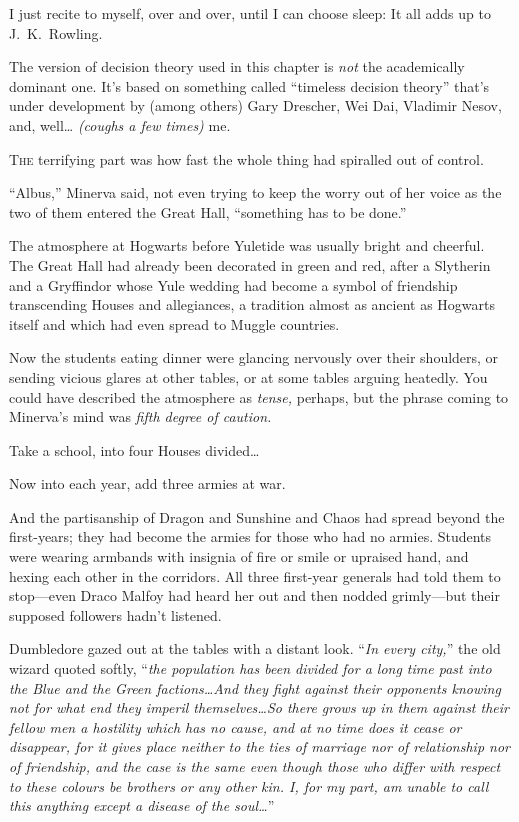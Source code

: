 
\begin{chapterOpeningAuthorNote}
I just recite to myself, over and over, until I can choose sleep: It all adds up to J.~K.~Rowling.

The version of decision theory used in this chapter is \emph{not} the academically dominant one. It’s based on something called “timeless decision theory” that’s under development by (among others) Gary Drescher, Wei Dai, Vladimir Nesov, and, well… \emph{(coughs a few times)} me.
\end{chapterOpeningAuthorNote}

\lettrine{T}{he} terrifying part was how fast the whole thing had spiralled out of control.

“Albus,” Minerva said, not even trying to keep the worry out of her voice as the two of them entered the Great Hall, “something has to be done.”

The atmosphere at Hogwarts before Yuletide was usually bright and cheerful. The Great Hall had already been decorated in green and red, after a Slytherin and a Gryffindor whose Yule wedding had become a symbol of friendship transcending Houses and allegiances, a tradition almost as ancient as Hogwarts itself and which had even spread to Muggle countries.

Now the students eating dinner were glancing nervously over their shoulders, or sending vicious glares at other tables, or at some tables arguing heatedly. You could have described the atmosphere as \emph{tense,} perhaps, but the phrase coming to Minerva’s mind was \emph{fifth degree of caution.}

Take a school, into four Houses divided…

Now into each year, add three armies at war.

And the partisanship of Dragon and Sunshine and Chaos had spread beyond the first-years; they had become the armies for those who had no armies. Students were wearing armbands with insignia of fire or smile or upraised hand, and hexing each other in the corridors. All three first-year generals had told them to stop—even Draco Malfoy had heard her out and then nodded grimly—but their supposed followers hadn’t listened.

Dumbledore gazed out at the tables with a distant look. “\emph{In every city,}” the old wizard quoted softly, “\emph{the population has been divided for a long time past into the Blue and the Green factions…And they fight against their opponents knowing not for what end they imperil themselves…So there grows up in them against their fellow men a hostility which has no cause, and at no time does it cease or disappear, for it gives place neither to the ties of marriage nor of relationship nor of friendship, and the case is the same even though those who differ with respect to these colours be brothers or any other kin. I, for my part, am unable to call this anything except a disease of the soul…}”

